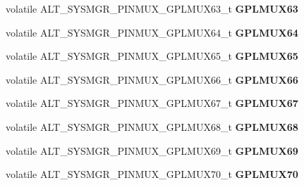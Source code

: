 \begin{DoxyCompactItemize}
volatile A\+L\+T\+\_\+\+S\+Y\+S\+M\+G\+R\+\_\+\+P\+I\+N\+M\+U\+X\+\_\+\+G\+P\+L\+M\+U\+X63\+\_\+t {\bfseries G\+P\+L\+M\+U\+X63}
\item 
\mbox{\label{structALT__SYSMGR__PINMUX__s_ac85e31f421055c201979bcf07075d530}} 
volatile A\+L\+T\+\_\+\+S\+Y\+S\+M\+G\+R\+\_\+\+P\+I\+N\+M\+U\+X\+\_\+\+G\+P\+L\+M\+U\+X64\+\_\+t {\bfseries G\+P\+L\+M\+U\+X64}
\item 
\mbox{\label{structALT__SYSMGR__PINMUX__s_a3b3f763727765edd1154b23eb5c7cb34}} 
volatile A\+L\+T\+\_\+\+S\+Y\+S\+M\+G\+R\+\_\+\+P\+I\+N\+M\+U\+X\+\_\+\+G\+P\+L\+M\+U\+X65\+\_\+t {\bfseries G\+P\+L\+M\+U\+X65}
\item 
\mbox{\label{structALT__SYSMGR__PINMUX__s_a718d6b88849a7925d1f5b124d49e47ad}} 
volatile A\+L\+T\+\_\+\+S\+Y\+S\+M\+G\+R\+\_\+\+P\+I\+N\+M\+U\+X\+\_\+\+G\+P\+L\+M\+U\+X66\+\_\+t {\bfseries G\+P\+L\+M\+U\+X66}
\item 
\mbox{\label{structALT__SYSMGR__PINMUX__s_ac636aa0a6864bc1e32c2d1d2bd27bb15}} 
volatile A\+L\+T\+\_\+\+S\+Y\+S\+M\+G\+R\+\_\+\+P\+I\+N\+M\+U\+X\+\_\+\+G\+P\+L\+M\+U\+X67\+\_\+t {\bfseries G\+P\+L\+M\+U\+X67}
\item 
\mbox{\label{structALT__SYSMGR__PINMUX__s_af261b0802c6cd40005ab58c9570a749a}} 
volatile A\+L\+T\+\_\+\+S\+Y\+S\+M\+G\+R\+\_\+\+P\+I\+N\+M\+U\+X\+\_\+\+G\+P\+L\+M\+U\+X68\+\_\+t {\bfseries G\+P\+L\+M\+U\+X68}
\item 
\mbox{\label{structALT__SYSMGR__PINMUX__s_a431ec10c3c19a2f7e78fb6a1806537c6}} 
volatile A\+L\+T\+\_\+\+S\+Y\+S\+M\+G\+R\+\_\+\+P\+I\+N\+M\+U\+X\+\_\+\+G\+P\+L\+M\+U\+X69\+\_\+t {\bfseries G\+P\+L\+M\+U\+X69}
\item 
\mbox{\label{structALT__SYSMGR__PINMUX__s_a1591137ae2076723730682725bfeb98d}} 
volatile A\+L\+T\+\_\+\+S\+Y\+S\+M\+G\+R\+\_\+\+P\+I\+N\+M\+U\+X\+\_\+\+G\+P\+L\+M\+U\+X70\+\_\+t {\bfseries G\+P\+L\+M\+U\+X70}
\item 
\mbox{\label{structALT__SYSMGR__PINMUX__s_af200c48b1e22de59a06fccee077ea4fc}} 

\end{DoxyCompactItemize}
